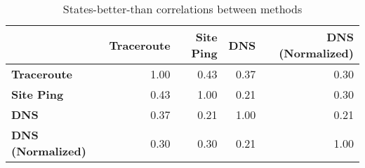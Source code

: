\begin{table}[h]
    \centering
    \begin{tabular}{lrrrr}
    \toprule
    {} & \textbf{Traceroute} & \textbf{Site Ping} & \textbf{DNS} &  \textbf{DNS (Normalized)} \\
    \midrule
    \textbf{Traceroute} &   1.00 &     0.43 &  0.37 &      0.30 \\
    \textbf{Site Ping} &  0.43 &      1.00 & 0.21 &       0.30 \\
    \textbf{DNS} &   0.37 &     0.21 &  1.00 &      0.21 \\
    \textbf{DNS (Normalized)} &  0.30 &      0.30 & 0.21 &       1.00 \\
    \bottomrule
    \end{tabular}
    \caption{States-better-than correlations between methods}
    \label{tab:states_better_than_correlation}
\end{table}